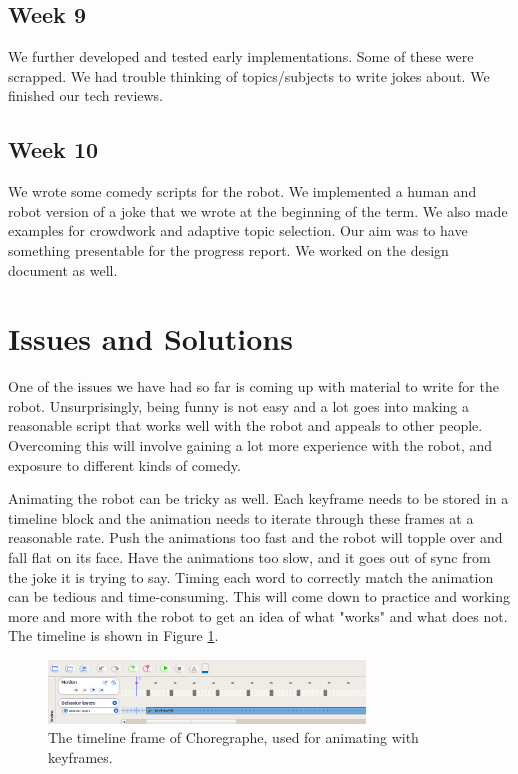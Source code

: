 \documentclass[onecolumn, draftclsnofoot,10pt, compsoc]{IEEEtran}
\begin{document}
\subsection{Week 9}
We further developed and tested early implementations. Some of these were scrapped. We had trouble thinking of topics/subjects to write jokes about. We finished our tech reviews.
\subsection{Week 10}
We wrote some comedy scripts for the robot. We implemented a human and robot version of a joke that we wrote at the beginning of the term. We also made examples for crowdwork and adaptive topic selection. Our aim was to have something presentable for the progress report. We worked on the design document as well.

\section{Issues and Solutions}
One of the issues we have had so far is coming up with material to write for the robot. Unsurprisingly, being funny is not easy and a lot goes into making a reasonable script that works well with the robot and appeals to other people. Overcoming this will involve gaining a lot more experience with the robot, and exposure to different kinds of comedy.

Animating the robot can be tricky as well. Each keyframe needs to be stored in a timeline block and the animation needs to iterate through these frames at a reasonable rate. Push the animations too fast and the robot will topple over and fall flat on its face. Have the animations too slow, and it goes out of sync from the joke it is trying to say. Timing each word to correctly match the animation can be tedious and time-consuming. This will come down to practice and working more and more with the robot to get an idea of what "works" and what does not. The timeline is shown in Figure \ref{fig:timeline}.

\begin{figure}[H]
  \centering
  \includegraphics[width=0.75\textwidth,height=0.75\textheight,keepaspectratio]{timeline}
  \caption{The timeline frame of Choregraphe, used for animating with keyframes.}
	\label{fig:timeline}
\end{figure}
\end{document}
